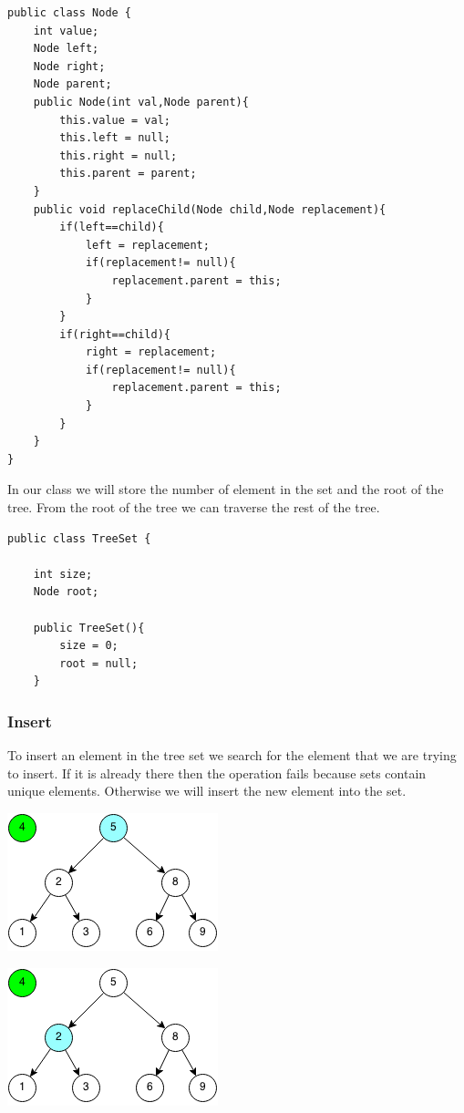 \documentclass[11pt,oneside]{book}
\makeatletter
\def\maxwidth#1{\ifdim\Gin@nat@width>#1 #1\else\Gin@nat@width\fi}
\makeatother
\begin{document}
\begin{lstlisting}
public class Node {
    int value;
    Node left;
    Node right;
    Node parent;
    public Node(int val,Node parent){
        this.value = val;
        this.left = null;
        this.right = null;
        this.parent = parent;
    }
    public void replaceChild(Node child,Node replacement){
        if(left==child){
            left = replacement;
            if(replacement!= null){
                replacement.parent = this;
            }
        }
        if(right==child){
            right = replacement;
            if(replacement!= null){
                replacement.parent = this;
            }
        }
    }
}
\end{lstlisting}

In our class we will store the number of element in the set and the root of the tree. From the root of the tree we can traverse the rest of the tree.

\begin{lstlisting}
public class TreeSet {

    int size;
    Node root;
    
    public TreeSet(){
        size = 0;
        root = null;
    }
\end{lstlisting}

\subsubsection{Insert}

To insert an element in the tree set we search for the element that we are trying to insert. If it is already there then the operation fails because sets contain unique elements. Otherwise we will insert the new element into the set.

\includegraphics[width=\maxwidth{\textwidth}]{bstinsert.png}

\includegraphics[width=\maxwidth{\textwidth}]{bstinsert2.png}
\end{document}
